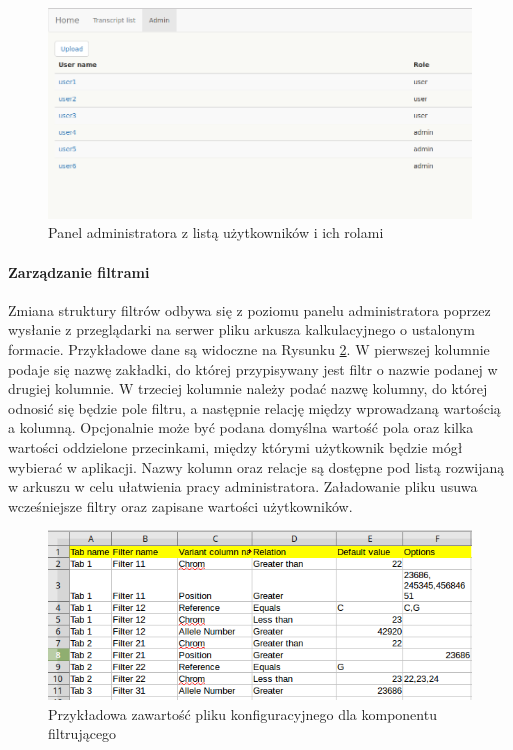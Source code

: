 \documentclass[a4paper,12pt,twoside]{article}
\begin{document}
\begin{figure}[h]
\centering
\includegraphics[width=\textwidth]{obrazy/aplikacja/admin.png}
\caption{Panel administratora z listą użytkowników i ich rolami}
\label{fig:adminpic}
\end{figure}

\newpage
\paragraph{Zarządzanie filtrami}

Zmiana struktury filtrów odbywa się z poziomu panelu administratora poprzez wysłanie
z przeglądarki na serwer pliku arkusza kalkulacyjnego o ustalonym formacie. Przykładowe dane są widoczne na Rysunku \ref{fig:input_filepic}.
W pierwszej kolumnie podaje się nazwę zakładki, do której przypisywany
jest filtr o nazwie podanej w drugiej kolumnie. W trzeciej kolumnie należy podać nazwę kolumny, do której
odnosić się będzie pole filtru, a następnie relację między wprowadzaną wartością a kolumną.
Opcjonalnie może być podana domyślna wartość pola oraz kilka wartości oddzielone przecinkami, między którymi użytkownik będzie mógł wybierać w aplikacji. Nazwy kolumn oraz relacje są dostępne pod
listą rozwijaną w arkuszu w celu ułatwienia pracy administratora.
Załadowanie pliku usuwa wcześniejsze filtry oraz zapisane wartości użytkowników.

\begin{figure}[h!]
\centering
\includegraphics[width=\textwidth]{obrazy/aplikacja/input_file.png}
\caption{Przykładowa zawartość pliku konfiguracyjnego dla komponentu filtrującego}
\label{fig:input_filepic}
\end{figure}
\end{document}
